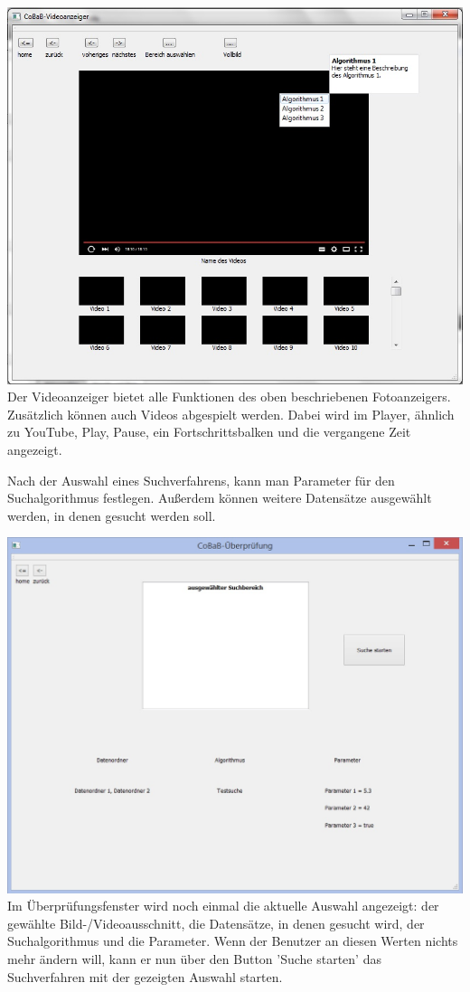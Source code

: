 \includegraphics[width=1\linewidth]{img/Videoanzeiger}
Der Videoanzeiger bietet alle Funktionen des oben beschriebenen Fotoanzeigers. Zusätzlich können auch Videos abgespielt werden. Dabei wird im Player, ähnlich zu YouTube, Play, Pause, ein Fortschrittsbalken und die vergangene Zeit angezeigt. 


Nach der Auswahl eines Suchverfahrens, kann man Parameter für den Suchalgorithmus festlegen. Außerdem können weitere Datensätze ausgewählt werden, in denen gesucht werden soll.

\includegraphics[width=1\linewidth]{img/Ueberpruefung}
Im Überprüfungsfenster wird noch einmal die aktuelle Auswahl angezeigt: der gewählte Bild-/Videoausschnitt, die Datensätze, in denen gesucht wird, der Suchalgorithmus und die Parameter. Wenn der Benutzer an diesen Werten nichts mehr ändern will, kann er nun über den Button 'Suche starten' das Suchverfahren mit der gezeigten Auswahl starten.

